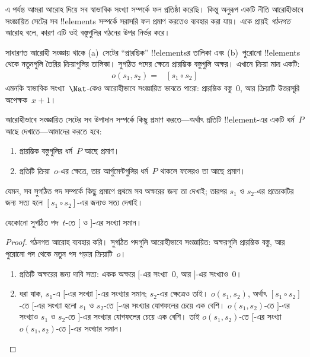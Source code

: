\documentclass[../../../include/open-logic-section]{subfiles}
\begin{document}


এ পর্যন্ত আমরা আরোহ দিয়ে সব স্বাভাবিক সংখ্যা সম্পর্কে
ফল প্রতিষ্ঠা করেছি। কিন্তু অনুরূপ একটি নীতি আরোহীভাবে
সংজ্ঞায়িত সেটের সব !!{element}s সম্পর্কে সরাসরি ফল
প্রমাণ করতেও ব্যবহার করা যায়। একে প্রায়ই \emph{গঠনগত}
আরোহ বলে, কারণ এটি ওই বস্তুগুলির গঠনের উপর নির্ভর করে।

সাধারণত আরোহী সংজ্ঞায় থাকে (a)~সেটের ``প্রারম্ভিক''
!!{element}sর তালিকা এবং (b)~পুরোনো !!{element}s থেকে
নতুনগুলি তৈরির ক্রিয়াগুলির তালিকা। সুগঠিত পদের ক্ষেত্রে
প্রারম্ভিক বস্তুগুলি অক্ষর। এখানে ক্রিয়া মাত্র একটি:
\begin{align*}
  o(s_1, s_2) = & [s_1 \circ s_2]
\end{align*}
এমনকি স্বাভাবিক সংখ্যা~$\Nat$-কেও আরোহীভাবে সংজ্ঞায়িত
ভাবতে পারো: প্রারম্ভিক বস্তু~$0$, আর ক্রিয়াটি উত্তরসূরি
অপেক্ষক~$x + 1$।

আরোহীভাবে সংজ্ঞায়িত সেটের সব উপাদান সম্পর্কে কিছু প্রমাণ
করতে—অর্থাৎ প্রতিটি !!{element}-এর একটি ধর্ম~$P$
আছে দেখাতে—আমাদের করতে হবে:
\begin{enumerate}
\item প্রারম্ভিক বস্তুগুলির ধর্ম~$P$ আছে প্রমাণ।
\item প্রতিটি ক্রিয়া~$o$-এর ক্ষেত্রে, তার আর্গুমেন্টগুলির
  ধর্ম~$P$ থাকলে ফলেরও তা আছে প্রমাণ।
\end{enumerate}
যেমন, সব সুগঠিত পদ সম্পর্কে কিছু প্রমাণে প্রথমে সব
অক্ষরের জন্য তা দেখাই; তারপর $s_1$ ও $s_2$-এর
প্রত্যেকটির জন্য সত্য হলে $[s_1 \circ s_2]$-এর জন্যও
সত্য দেখাই।

\begin{prop}
  যেকোনো সুগঠিত পদ~$t$-তে $[$ ও $]$-এর সংখ্যা সমান।
\end{prop}

\begin{proof}
গঠনগত আরোহ ব্যবহার করি। সুগঠিত পদগুলি আরোহীভাবে
সংজ্ঞায়িত: অক্ষরগুলি প্রারম্ভিক বস্তু, আর পুরোনো পদ থেকে
নতুন পদ গড়ার ক্রিয়াটি~$o$।
\begin{enumerate}
\item প্রতিটি অক্ষরের জন্য দাবি সত্য: একক অক্ষরে $[$-এর
  সংখ্যা~$0$, আর $]$-এর সংখ্যাও~$0$।
\item ধরা যাক, $s_1$-এ $[$-এর সংখ্যা $]$-এর সংখ্যার
  সমান; $s_2$-এর ক্ষেত্রেও তাই। $o(s_1, s_2)$, অর্থাৎ
  $[s_1 \circ s_2]$-তে $[$-এর সংখ্যা হলো $s_1$ ও
  $s_2$-তে $[$-এর সংখ্যার যোগফলের চেয়ে এক বেশি।
  $o(s_1, s_2)$-তে $]$-এর সংখ্যাও $s_1$ ও $s_2$-তে
  $]$-এর সংখ্যার যোগফলের চেয়ে এক বেশি। তাই
  $o(s_1, s_2)$-তে $[$-এর সংখ্যা $o(s_1,s_2)$-তে
  $]$-এর সংখ্যার সমান।
\end{enumerate}
\end{proof}
\end{document}
